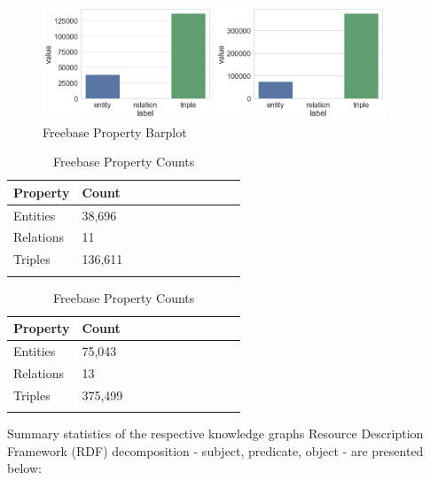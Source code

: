 \begin{figure}[H]
	\parbox{.5\linewidth}{
   		\centering
    		\includegraphics[width=0.45\textwidth]{Wordnet_Counts}
		\caption{Wordnet Property Barplot}
		}
	\hfill
	\parbox{.5\linewidth}{
   		\centering
    		\includegraphics[width=0.45\textwidth]{Freebase_Counts}
		\caption{Freebase Property Barplot}
		}
\end{figure}

\begin{table}[H]
	\parbox{.5\linewidth}{
		\centering
		\begin{tabular}{lllllllllll}
  			\textbf{Property} & \textbf{Count}  \\
  			\hline
  			Entities & 38,696  \\
  			Relations & 11  \\
  			Triples & 136,611  \\
			&
		\end{tabular}
		\caption{Wordnet Property Counts}
		}
	\hfill
	\parbox{.5\linewidth}{
		\centering
		\begin{tabular}{lllllllllll}
  			\textbf{Property} & \textbf{Count}  \\
  			\hline
  			Entities & 75,043   \\
  			Relations & 13  \\
  			Triples & 375,499  \\
			&
		\end{tabular}
		\caption{Freebase Property Counts}
		}
\end{table}


\noindent Summary statistics of the respective knowledge graphs Resource Description Framework (RDF) decomposition - subject, predicate, object - are presented below:

